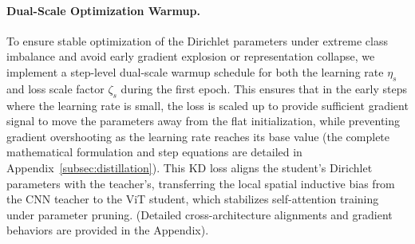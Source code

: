 \documentclass[letterpaper]{article} %
\begin{document}
\paragraph{Dual-Scale Optimization Warmup.}
To ensure stable optimization of the Dirichlet parameters under extreme class imbalance and avoid early gradient explosion or representation collapse, we implement a step-level dual-scale warmup schedule for both the learning rate $\eta_s$ and loss scale factor $\zeta_s$ during the first epoch. This ensures that in the early steps where the learning rate is small, the loss is scaled up to provide sufficient gradient signal to move the parameters away from the flat initialization, while preventing gradient overshooting as the learning rate reaches its base value (the complete mathematical formulation and step equations are detailed in Appendix~\ref{subsec:distillation}).
This KD loss aligns the student's Dirichlet parameters with the teacher's, transferring the local spatial inductive bias from the CNN teacher to the ViT student, which stabilizes self-attention training under parameter pruning. (Detailed cross-architecture alignments and gradient behaviors are provided in the Appendix).
\end{document}

